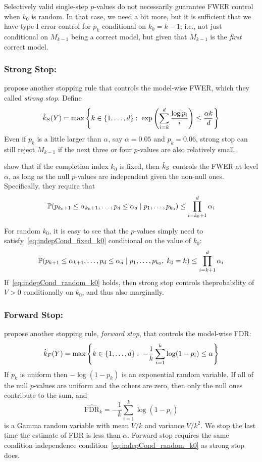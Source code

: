 \documentclass{article}
\begin{document}
Selectively valid single-step $p$-values do not necessarily guarantee FWER control when $k_0$ is random. In that case, we need a bit more, but it is sufficient that we have type I error control for $p_k$ conditional on $k_0=k-1$; i.e., not just conditional on $M_{k-1}$ being a correct model, but given that $M_{k-1}$ is the {\em first} correct model.

\subsubsection{Strong Stop:}

\citet{gsell2013sequential} propose another stopping rule that controls the model-wise FWER, which they called {\em strong stop}. Define
\[
  \hk_{S}(Y) = \max\left\{k \in \{1,\ldots,d\} :\;
    \exp\left(\sum_{i=k}^d \frac{\log p_i}{i}\right) 
    \leq \frac{\alpha k}{d}\right\}
\]
Even if $p_k$ is a little larger than $\alpha$, say $\alpha=0.05$ and $p_k=0.06$, strong stop can still reject $M_{k-1}$ if the next three or four $p$-values are also relatively small.

\citet{gsell2013sequential} show that if the completion index $k_0$ is fixed, then $\hk_S$ controls the FWER at level $\alpha$, as long as the null $p$-values are independent given the non-null ones. Specifically, they require that
\begin{equation}\label{eq:indepCond_fixed_k0}
\P(p_{k_0+1} \leq \alpha_{k_0+1}, \ldots, p_d \leq \alpha_d
\mid p_1, \ldots, p_{k_0}) \leq \prod_{i=k_0+1}^d \alpha_i
\end{equation}

For random $k_0$, it is easy to see that the $p$-values simply need to satisfy~\eqref{eq:indepCond_fixed_k0} conditional on the value of $k_0$:
\begin{equation}\label{eq:indepCond_random_k0}
  \P(p_{k+1} \leq \alpha_{k+1}, \ldots, p_d \leq \alpha_d
  \mid p_1, \ldots, p_{k_0}, \; k_0 = k) \leq \prod_{i=k+1}^d \alpha_i
\end{equation}
If~\eqref{eq:indepCond_random_k0} holds, then strong stop controls theprobability of $V>0$ conditionally on $k_0$, and thus also marginally.

\subsubsection{Forward Stop:}

\citet{gsell2013sequential} propose another stopping rule, {\em forward stop}, that controls the model-wise FDR:
\[
  \hk_{F}(Y) = \max\left\{k \in \{1,\ldots,d\} :\;
    -\frac{1}{k}\sum_{i=1}^k \log(1-p_i) \leq \alpha\right\}
\]
If $p_k$ is uniform then  $-\log(1-p_k)$ is an exponential random variable. If all of the null $p$-values are uniform and the others are zero, then only the null ones contribute to the sum, and
\[
\widehat{\text{FDR}}_k = -\frac{1}{k}\sum_{i=1}^k \log(1-p_i)
\]
is a Gamma random variable with mean $V/k$ and variance $V/k^2$. We stop the last time the estimate of FDR is less than $\alpha$. Forward stop requires the same condition independence condition~\eqref{eq:indepCond_random_k0} as strong stop does.
\end{document}
